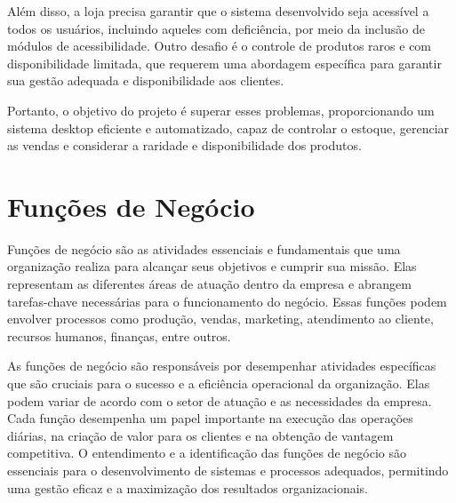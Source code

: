 \documentclass[
	12pt,				%
	openright,			%
	twoside,			%
	a4paper,			%
	english,			%
	brazil				%
	]{abntex2}
\begin{document}
Além disso, a loja precisa garantir que o sistema desenvolvido seja acessível a todos os usuários, incluindo aqueles com deficiência, por meio da inclusão de módulos de acessibilidade. Outro desafio é o controle de produtos raros e com disponibilidade limitada, que requerem uma abordagem específica para garantir sua gestão adequada e disponibilidade aos clientes.

Portanto, o objetivo do projeto é superar esses problemas, proporcionando um sistema desktop eficiente e automatizado, capaz de controlar o estoque, gerenciar as vendas e considerar a raridade e disponibilidade dos produtos.

\chapter{Funções de Negócio}\label{func_neg}
Funções de negócio são as atividades essenciais e fundamentais que uma organização realiza para alcançar seus objetivos e cumprir sua missão. Elas representam as diferentes áreas de atuação dentro da empresa e abrangem tarefas-chave necessárias para o funcionamento do negócio. Essas funções podem envolver processos como produção, vendas, marketing, atendimento ao cliente, recursos humanos, finanças, entre outros.

As funções de negócio são responsáveis por desempenhar atividades específicas que são cruciais para o sucesso e a eficiência operacional da organização. Elas podem variar de acordo com o setor de atuação e as necessidades da empresa. Cada função desempenha um papel importante na execução das operações diárias, na criação de valor para os clientes e na obtenção de vantagem competitiva. O entendimento e a identificação das funções de negócio são essenciais para o desenvolvimento de sistemas e processos adequados, permitindo uma gestão eficaz e a maximização dos resultados organizacionais.
\end{document}
